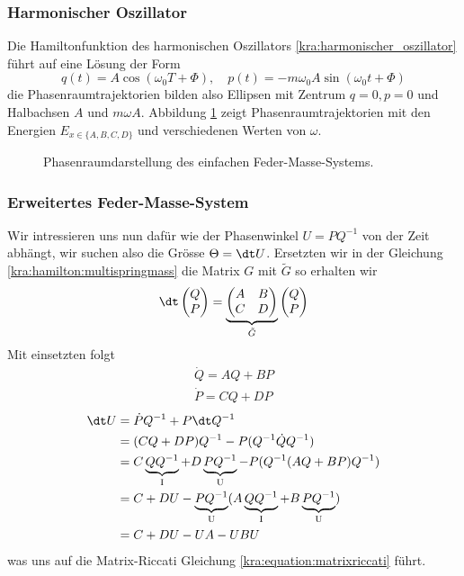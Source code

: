 \subsubsection{Harmonischer Oszillator}
Die Hamiltonfunktion des harmonischen Oszillators \ref{kra:harmonischer_oszillator} führt auf eine Lösung der Form
\begin{equation*}
    q(t) = A \cos(\omega_0 T + \Phi), \quad p(t) = -m \omega_0 A \sin(\omega_0 t + \Phi)
\end{equation*}
die Phasenraumtrajektorien bilden also Ellipsen mit Zentrum $q=0, p=0$ und Halbachsen $A$ und $m \omega A$.
Abbildung \ref{kra:fig:phasenraum} zeigt Phasenraumtrajektorien mit den Energien $E_{x \in \{A, B, C, D\}}$ und verschiedenen Werten von $\omega$.
\begin{figure}
    
    \caption{Phasenraumdarstellung des einfachen Feder-Masse-Systems.}
    \label{kra:fig:phasenraum}
\end{figure}

\subsubsection{Erweitertes Feder-Masse-System}
Wir intressieren uns nun dafür wie der Phasenwinkel $U = PQ^{-1}$ von der Zeit abhängt,
wir suchen also die Grösse $\Theta = \dt U$.
Ersetzten wir in der Gleichung \ref{kra:hamilton:multispringmass} die Matrix $G$ mit $\tilde{G}$ so erhalten wir
\begin{equation}
    \dt
    \begin{pmatrix}
        Q \\
        P
    \end{pmatrix}
    =
    \underbrace{
        \begin{pmatrix}
            A & B \\
            C & D
        \end{pmatrix}
    }_{\tilde{G}}
    \begin{pmatrix}
        Q \\
        P
    \end{pmatrix}
\end{equation}
Mit einsetzten folgt
\begin{align*}
    \dot{Q} = AQ + BP \\
    \dot{P} = CQ + DP
\end{align*}
\begin{equation}
    \begin{split}
        \dt U   &= \dot{P} Q^{-1} + P \dt Q^{-1} \\
        &= (CQ + DP) Q^{-1} - P (Q^{-1} \dot{Q} Q^{-1}) \\
        &= C\underbrace{QQ^{-1}}_\text{I} + D\underbrace{PQ^{-1}}_\text{U} - P(Q^{-1} (AQ + BP) Q^{-1}) \\
        &= C + DU - \underbrace{PQ^{-1}}_\text{U}(A\underbrace{QQ^{-1}}_\text{I} + B\underbrace{PQ^{-1}}_\text{U}) \\
        &= C  + DU - UA - UBU
    \end{split}
\end{equation}
was uns auf die Matrix-Riccati Gleichung \ref{kra:equation:matrixriccati} führt.

